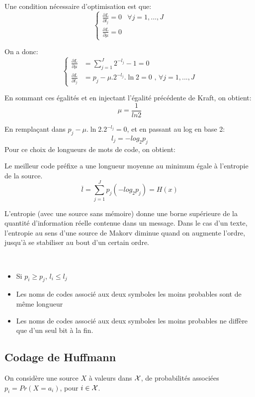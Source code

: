 \documentclass[main.tex]{subfiles}
\begin{document}
Une condition nécessaire d'optimisation est que:
 \[\left\{ \begin{matrix}
 \frac{\partial L}{\partial l_j}=0 & \forall j=1,...,J\\
 \frac{\partial L}{\partial \mu} = 0
 \end{matrix}\right.\]

 On a donc:
 \[
   \begin{cases}
     \frac{\partial L}{\partial \mu} & = \sum_{j=1}^J2^{-l_j} - 1 = 0 \\
     \frac{\partial L}{\partial l_j} & = p_j-\mu. 2^{-l_j}.\ln2 = 0 \text{	, }\forall j=1,...,J
   \end{cases}
\]

 En sommant ces égalités et en injectant l'égalité précédente de Kraft, on obtient:
 \[\mu = \frac{1}{ln2}\]

 En remplaçant dans $p_j-\mu. \ln2. 2^{-l_j} = 0$, et en passant au log en base 2:
 \[\boxed{l_j = -log_2p_j}\]
 \bigbreak
 \bigbreak
 Pour ce choix de longueurs de mots de code, on obtient:
 \begin{prop}
    Le meilleur code préfixe a une longueur moyenne au minimum égale à l'entropie de la source.
 \[ \boxed{ \overline{l} = \sum_{j=1}^J p_j(-log_2p_j) = H(x)}\]
\end{prop}

\begin{rem}
 L'entropie (avec une source sans mémoire) donne une borne supérieure de la quantité d'information réelle contenue dans un message. Dans le cas d'un texte, l'entropie au sens d'une source de Makorv diminue quand on augmente l'ordre, jusqu'à se stabiliser au bout d'un certain ordre.
\end{rem}~

\begin{prop}
   \begin{itemize}
    \item Si $p_i\ge p_j$, $l_i\le l_j$
    \item Les noms de codes associé aux deux symboles les moins probables sont de même longueur
    \item Les noms de codes associé aux deux symboles les moins probables ne diffère que d'un seul bit à la fin.
   \end{itemize}
 \end{prop}
\subsection{Codage de Huffmann}
On considère une source $X$ à valeurs dans $\mathcal{X}$, de probabilités associées $p_i=Pr(X=a_i)$, pour $i\in\mathcal{X}$.
\end{document}
